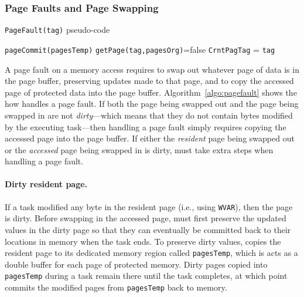 \subsubsection{Page Faults and Page Swapping}

\begin{algorithm}[t]
	\caption{\texttt{PageFault(tag)} pseudo-code}
	\label{algo:pagefault}
	\scriptsize
	\begin{algorithmic}[1]
			
		\State \texttt{pageCommit(pagesTemp)} 
		\EndIf
		 
		 
		\Else
		\State \texttt{getPage(tag,pagesOrg)}=false 
		\EndIf 
		\State \texttt{CrntPagTag} = \texttt{tag} 
	\end{algorithmic}
\end{algorithm}

A page fault on a memory access requires \sys to swap out whatever page of data is in the page buffer, preserving updates made to that page, and to copy the accessed page of protected data into the page buffer. Algorithm~\ref{algo:pagefault} shows the how \sys handles a page fault. If both the page being swapped out and the page being swapped in are not {\em dirty}---which means that they do not contain bytes modified by the executing task---then handling a page fault simply requires copying the accessed page into the page buffer. If either the {\em resident} page being swapped out or the {\em accessed} page being swapped in is dirty, \sys must take extra steps when handling a page fault. 

\paragraph{Dirty resident page.} If a task modified any byte in the resident page (i.e.,  using \texttt{WVAR}), then the page is dirty. Before swapping in the accessed page, \sys must first preserve the updated values in the dirty page so that they can eventually be committed back to their locations in memory when the task ends. To preserve dirty values, \sys copies the resident page to its dedicated memory region called \texttt{pagesTemp}, which is acts as a double buffer for each page of protected memory. Dirty pages copied into {\tt pagesTemp} during a task remain there until the task completes, at which point \sys commits the modified pages from {\tt pagesTemp} back to memory.  

